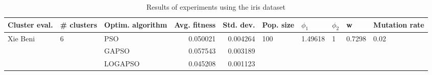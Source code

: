 \begin{table}
\centering
\caption{Results of experiments using the iris dataset}
\begin{tabular}{lllrrlllll}
\toprule
            Cluster eval. &        \# clusters & Optim. algorithm &  Avg. fitness &  Std. dev. &            Pop. size &               $\phi_{1}$ &         $\phi_{2}$ &                       w &         Mutation rate \\
\midrule
\multirow{3}{*}{Xie Beni} & \multirow{3}{*}{6} &              PSO &      0.050021 &   0.004264 & \multirow{3}{*}{100} & \multirow{3}{*}{1.49618} & \multirow{3}{*}{1} & \multirow{3}{*}{0.7298} & \multirow{3}{*}{0.02} \\
                          &                    &            GAPSO &      0.057543 &   0.003189 &                      &                          &                    &                         &                       \\
                          &                    &          LOGAPSO &      0.045208 &   0.001123 &                      &                          &                    &                         &                       \\
\bottomrule
\end{tabular}
\end{table}
